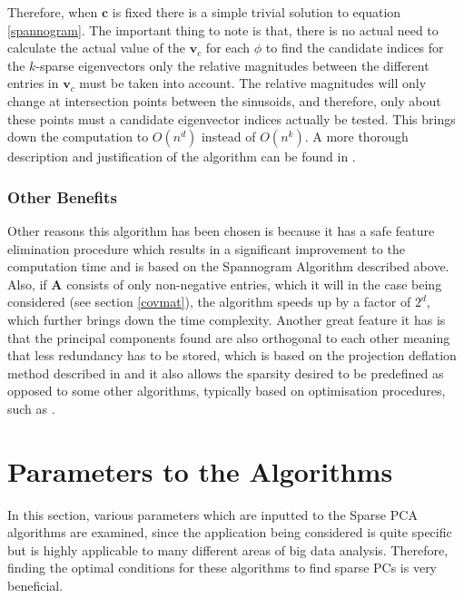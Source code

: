 \documentclass[11pt,a4paper]{article}
\begin{document}
Therefore, when $\mathbf{c}$ is fixed there is a simple trivial solution to  equation \ref{spannogram}. The important thing to note is that, there is no actual need to calculate the actual value of the $\mathbf{v}_c$ for each $\phi$ to find the candidate indices for the $k$-sparse eigenvectors only the relative magnitudes between the different entries in  $\mathbf{v}_c$ must be taken into account. The relative magnitudes will only change at intersection points between the sinusoids, and therefore, only about these points must a candidate eigenvector indices actually be tested. This brings down the computation to $O \left(n^d\right)$ instead of $O \left(n^k\right)$. A more thorough description and justification of the algorithm can be found in \cite{dimakis}.

\subsubsection{Other Benefits}
Other reasons this algorithm has been chosen is because it has a safe feature elimination procedure which results in a significant improvement to the computation time and is based on the Spannogram Algorithm described above. Also, if $\mathbf{A}$ consists of only non-negative entries, which it will in the case being considered (see section \ref{covmat}), the algorithm speeds up by a factor of $2^d$, which further brings down the time complexity. Another great feature it has is that the principal components found are also orthogonal to each other meaning that less redundancy has to be stored, which is based on the projection deflation method described in \cite{Mackey_deflationmethods} and it also allows the sparsity desired to be predefined as opposed to some other algorithms, typically based on optimisation procedures, such as \cite{GPower}.
\clearpage

\section{Parameters to the Algorithms}

In this section, various parameters which are inputted to the Sparse PCA algorithms are examined, since the application being considered is quite specific but is highly applicable to many different areas of big data analysis. Therefore, finding the optimal conditions for these algorithms to find sparse PCs is very beneficial. 
\end{document}
